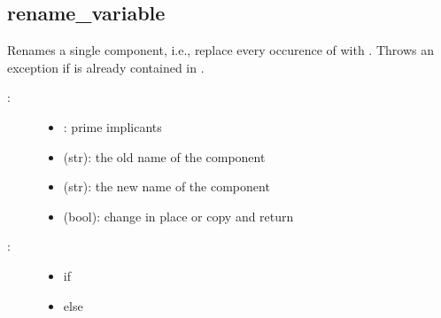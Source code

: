\documentclass[letterpaper,10pt,english]{sphinxmanual}
\begin{document}
\begin{fulllineitems}
\end{fulllineitems}



\subsection{rename\_variable}
\label{\detokenize{PrimeImplicants:rename-variable}}\label{\detokenize{PrimeImplicants:id13}}

\begin{fulllineitems}
\label{\detokenize{PrimeImplicants:PyBoolNet.PrimeImplicants.rename_variable}}
Renames a single component, i.e., replace every occurence of  with .
Throws an exception if  is already contained in .
\begin{description}
\item[{:}] \leavevmode\begin{itemize}
\item {} 
: prime implicants

\item {} 
 (str): the old name of the component

\item {} 
 (str): the new name of the component

\item {} 
 (bool): change  in place or copy and return

\end{itemize}

\item[{:}] \leavevmode\begin{itemize}
\item {} 
 if 

\item {} 
 else

\end{itemize}

\end{description}


\end{fulllineitems}
\end{document}
